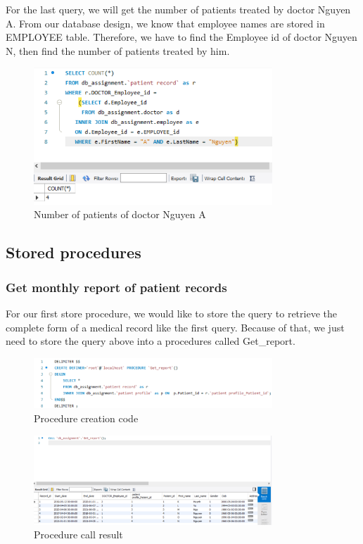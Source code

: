 For the last query, we will get the number of patients treated by doctor Nguyen A.
From our database design, we know that employee names are stored in EMPLOYEE table.
Therefore, we have to find the Employee id of doctor Nguyen N, then find the number of patients treated by him.

\begin{figure}[H]
  \centering
  \includegraphics[width=0.8\textwidth]{assets/query_3a.png}
  \captionsetup{justification=centering,margin=2cm}
  \caption{Number of patients of doctor Nguyen A}
\end{figure}

\subsection{Stored procedures}

\subsubsection{Get monthly report of patient records}
For our first store procedure, we would like to store the query to retrieve the complete form of a medical record like the first query.
Because of that, we just need to store the query above into a procedures called Get\_report.

\begin{figure}[H]
  \centering
  \includegraphics[width=0.8\textwidth]{assets/procedure_1a.png}
  \captionsetup{justification=centering,margin=2cm}
  \caption{Procedure creation code}
\end{figure}

\begin{figure}[H]
  \centering
  \includegraphics[width=0.8\textwidth]{assets/procedure_1b.png}
  \captionsetup{justification=centering,margin=2cm}
  \caption{Procedure call result}
\end{figure}

